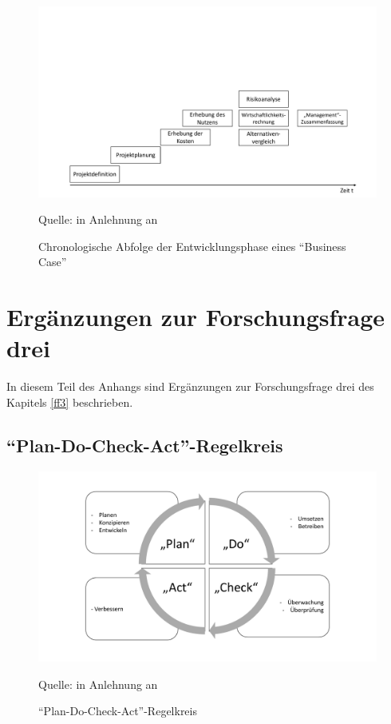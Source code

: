 \begin{figure}[H]
	\centering
	\includegraphics[scale=0.48]{img/chronoBC.pdf}
	\caption{Chronologische Abfolge der Entwicklungsphase eines \enquote{Business Case}}
	{\footnotesize Quelle: in Anlehnung an \cite[][]{herman_is_2009}}
	\label{abb:entwicklungBC}
\end{figure}

\chapter{Ergänzungen zur Forschungsfrage drei} \label{appendixFF3}
In diesem Teil des Anhangs sind Ergänzungen zur Forschungsfrage drei des Kapitels \vref{ff3} beschrieben.

\section{\enquote{Plan-Do-Check-Act}-Regelkreis}

\begin{figure}[H]
	\centering
	\includegraphics[scale=0.51]{img/planDoCheckAct.pdf}
	\caption{\enquote{Plan-Do-Check-Act}-Regelkreis}
	{\footnotesize Quelle: in Anlehnung an \cite[][S.\,12]{kersten_it-sicherheitsmanagement_2020}}
	\label{abb:planDoCheckAct}
\end{figure}

